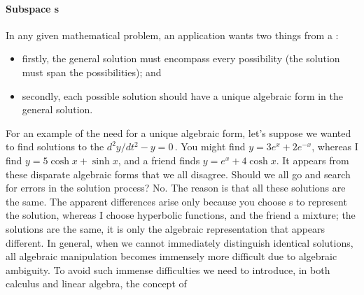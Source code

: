 \paragraph{Subspace s} 
In any given mathematical problem, an application wants two things from a : 
\begin{itemize}
\item firstly, the general solution must encompass every possibility (the solution must span the possibilities); and 
\item secondly, each possible solution should have a unique algebraic form in the general solution.
\end{itemize}
For an example of the need for a unique algebraic form, let's suppose we wanted to find solutions to the  \(d^2y/dt^2-y=0\)\,. 
You might find \(y=3e^x+2e^{-x}\), whereas I find \(y=5\cosh x+\sinh x\), and a friend finds \(y=e^x+4\cosh x\).
It appears from these disparate algebraic forms that we all disagree.
Should we all go and search for errors in the solution process?  No.
The reason is that all these solutions are the same.
The apparent differences arise only because you choose s to represent the solution, whereas I choose hyperbolic functions, and the friend a mixture; the solutions are the same, it is only the algebraic representation that appears different. 
In general, when we cannot immediately distinguish identical solutions, all algebraic manipulation becomes immensely more difficult due to algebraic ambiguity.
To avoid such immense difficulties we need to introduce, in both calculus and linear algebra, the concept of 

